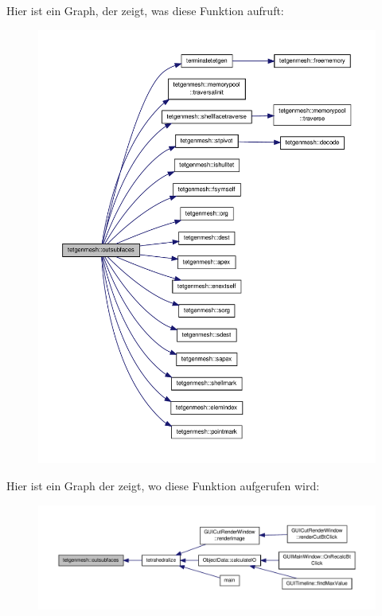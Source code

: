 Hier ist ein Graph, der zeigt, was diese Funktion aufruft\-:
\nopagebreak
\begin{figure}[H]
\begin{center}
\leavevmode
\includegraphics[width=350pt]{classtetgenmesh_a357976a26bd46ca731e3492f6d96e7eb_cgraph}
\end{center}
\end{figure}




Hier ist ein Graph der zeigt, wo diese Funktion aufgerufen wird\-:
\nopagebreak
\begin{figure}[H]
\begin{center}
\leavevmode
\includegraphics[width=350pt]{classtetgenmesh_a357976a26bd46ca731e3492f6d96e7eb_icgraph}
\end{center}
\end{figure}



